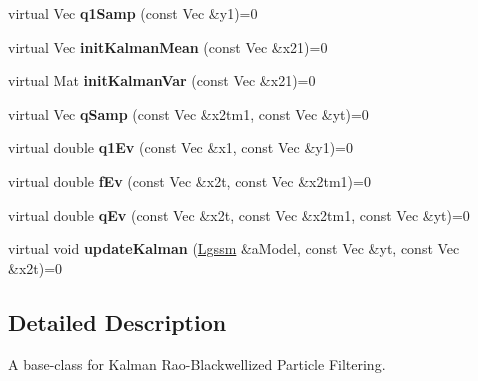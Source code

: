 \begin{DoxyCompactItemize}
\item 
virtual Vec {\bfseries q1\+Samp} (const Vec \&y1)=0\hypertarget{classKalman__RBPF_a71e394c093f606f80a92a3fc4fe087a3}{}\label{classKalman__RBPF_a71e394c093f606f80a92a3fc4fe087a3}

\item 
virtual Vec {\bfseries init\+Kalman\+Mean} (const Vec \&x21)=0\hypertarget{classKalman__RBPF_a870a53fc149adf8042fa12eb5d9a8d30}{}\label{classKalman__RBPF_a870a53fc149adf8042fa12eb5d9a8d30}

\item 
virtual Mat {\bfseries init\+Kalman\+Var} (const Vec \&x21)=0\hypertarget{classKalman__RBPF_a4f7f37a90d9382ca2ad7dfef4acf1bc0}{}\label{classKalman__RBPF_a4f7f37a90d9382ca2ad7dfef4acf1bc0}

\item 
virtual Vec {\bfseries q\+Samp} (const Vec \&x2tm1, const Vec \&yt)=0\hypertarget{classKalman__RBPF_ad3ee89a06a18a287445e366230a6bd65}{}\label{classKalman__RBPF_ad3ee89a06a18a287445e366230a6bd65}

\item 
virtual double {\bfseries q1\+Ev} (const Vec \&x1, const Vec \&y1)=0\hypertarget{classKalman__RBPF_abc3a0c0214699593426db94db29298d6}{}\label{classKalman__RBPF_abc3a0c0214699593426db94db29298d6}

\item 
virtual double {\bfseries f\+Ev} (const Vec \&x2t, const Vec \&x2tm1)=0\hypertarget{classKalman__RBPF_a03bfc2e7f32a86ab4fe653958d2f7dd4}{}\label{classKalman__RBPF_a03bfc2e7f32a86ab4fe653958d2f7dd4}

\item 
virtual double {\bfseries q\+Ev} (const Vec \&x2t, const Vec \&x2tm1, const Vec \&yt)=0\hypertarget{classKalman__RBPF_ad5b8e717c5d4c838b0d246b496971d16}{}\label{classKalman__RBPF_ad5b8e717c5d4c838b0d246b496971d16}

\item 
virtual void {\bfseries update\+Kalman} (\hyperlink{classLgssm}{Lgssm} \&a\+Model, const Vec \&yt, const Vec \&x2t)=0\hypertarget{classKalman__RBPF_a67abffa6fe0510147037ed102aa30ed0}{}\label{classKalman__RBPF_a67abffa6fe0510147037ed102aa30ed0}

\end{DoxyCompactItemize}


\subsection{Detailed Description}
A base-\/class for Kalman Rao-\/\+Blackwellized Particle Filtering. 


